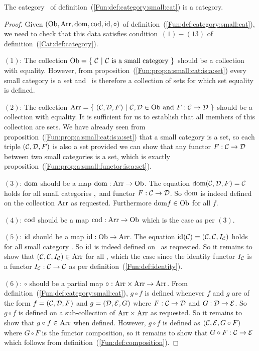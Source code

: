 \begin{prop}\label{Fun:prop:category:small:cat}
    The category \cat\ of definition~(\ref{Fun:def:category:small:cat}) is 
    a category.
\end{prop}
\begin{proof}
    Given $(\mbox{\rm Ob}, \mbox{\rm Arr}, \mbox{\rm dom}, \mbox{\rm cod}, \mbox{\rm id}, \circ)$ of
    definition~(\ref{Fun:def:category:small:cat}), we need to check that this
    data satisfies condition~$(1)-(13)$ of definition~(\ref{Cat:def:category}).

    $(1)$: The collection $\ob=\{\ \Cat\ |\ \mbox{\Cat\ is a small category}\ \}$
    should be a collection with equality. However, from
    proposition~(\ref{Fun:prop:a:small:cat:is:a:set}) every small category is 
    a set and \ob\ is therefore a collection of sets for which set equality 
    is defined.
    
    $(2)$: The collection $\arr =\{\ (\Cat,\Dat,F)\ |\ \Cat,\Dat\in\ob\  
    \mbox{and}\ F:\Cat\to\Dat\ \}$ should be a collection with equality.
    It is sufficient for us to establish that all members of this collection
    are sets. We have already seen from 
    proposition~(\ref{Fun:prop:a:small:cat:is:a:set}) that a small category 
    is a set, so each triple $(\mbox{$\cal C$},\mbox{$\cal D$},F)$ is also a set provided we can 
    show that any functor $F:\mbox{$\cal C$}\to\mbox{$\cal D$}$ between two small categories is a 
    set, which is exactly proposition~(\ref{Fun:prop:a:small:functor:is:a:set}).
    
    $(3)$: $\mbox{\rm dom}$ should be a map $\mbox{\rm dom}:\mbox{\rm Arr}\to\mbox{\rm Ob}$. The equation
    $\mbox{\rm dom}(\mbox{$\cal C$},\mbox{$\cal D$},F)=\mbox{$\cal C$}$ holds for all small categories \Cat,\Dat\ and 
    functor $F:\mbox{$\cal C$}\to\mbox{$\cal D$}$. So $\mbox{\rm dom}$ is indeed defined on the collection
    $\mbox{\rm Arr}$ as requested. Furthermore $\mbox{\rm dom} f \in\mbox{\rm Ob}$ for all $f$.

    $(4)$: $\mbox{\rm cod}$ should be a map $\mbox{\rm cod}:\mbox{\rm Arr}\to\mbox{\rm Ob}$ which is the case 
    as per $(3)$.

    $(5)$: $\mbox{\rm id}$ should be a map $\mbox{\rm id}:\mbox{\rm Ob}\to\mbox{\rm Arr}$. The equation $\mbox{\rm id}(\mbox{$\cal C$})
    =(\mbox{$\cal C$},\mbox{$\cal C$},I_{\cal C})$ holds for all small category \Cat. So $\mbox{\rm id}$
    is indeed defined on \ob\ as requested. So it remains to show that
    $(\mbox{$\cal C$},\mbox{$\cal C$},I_{\cal C})\in\mbox{\rm Arr}$ for all \Cat, which the case since
    the identity functor $I_{\cal C}$ is a functor $I_{\cal C}:\mbox{$\cal C$}\to\mbox{$\cal C$}$ as 
    per definition~(\ref{Fun:def:identity}).

    $(6)$: $\circ$ should be a partial map $\circ:\mbox{\rm Arr}\times\mbox{\rm Arr}\to\mbox{\rm Arr}$.
    From definition~(\ref{Fun:def:category:small:cat}), $g\circ f$ is defined
    whenever $f$ and $g$ are of the form $f=(\mbox{$\cal C$},\mbox{$\cal D$},F)$ and $g=(\mbox{$\cal D$},\mbox{$\cal E$},G)$
    where $F:\mbox{$\cal C$}\to\mbox{$\cal D$}$ and $G:\mbox{$\cal D$}\to\mbox{$\cal E$}$. So $g\circ f$ is defined on
    a sub-collection of $\mbox{\rm Arr}\times\mbox{\rm Arr}$ as requested. So it remains to 
    show that $g\circ f\in\mbox{\rm Arr}$ when defined. However, $g\circ f$ is defined
    as $(\mbox{$\cal C$},\mbox{$\cal E$},G \circ F)$ where $G\circ F$ is the functor composition,
    so it remains to show that $G\circ F:\mbox{$\cal C$}\to\mbox{$\cal E$}$ which follows from
    definition~(\ref{Fun:def:composition}).


\end{proof}
